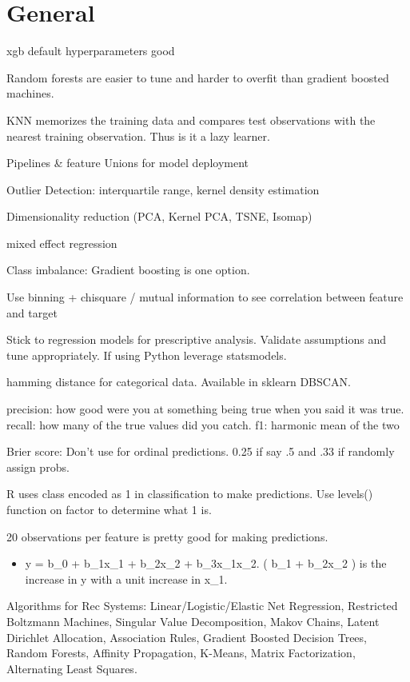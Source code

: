 \documentclass[]{book}
\providecommand{\tightlist}{%
  \setlength{\itemsep}{0pt}\setlength{\parskip}{0pt}}
\begin{document}
\hypertarget{general-2}{%
\section{General}\label{general-2}}

xgb default hyperparameters good

Random forests are easier to tune and harder to overfit than gradient boosted machines.

KNN memorizes the training data and compares test observations with the nearest training observation. Thus is it a lazy learner.

Pipelines \& feature Unions for model deployment

Outlier Detection: interquartile range, kernel density estimation

Dimensionality reduction (PCA, Kernel PCA, TSNE, Isomap)

mixed effect regression

Class imbalance: Gradient boosting is one option.

Use binning + chisquare / mutual information to see correlation between feature and target

Stick to regression models for prescriptive analysis. Validate assumptions and tune appropriately. If using Python leverage statsmodels.

hamming distance for categorical data. Available in sklearn DBSCAN.

precision: how good were you at something being true when you said it was true. recall: how many of the true values did you catch. f1: harmonic mean of the two

Brier score: Don't use for ordinal predictions. 0.25 if say .5 and .33 if randomly assign probs.

R uses class encoded as 1 in classification to make predictions. Use levels() function on factor to determine what 1 is.

20 observations per feature is pretty good for making predictions.

\begin{itemize}
\tightlist
\item
  y = b\_0 + b\_1x\_1 + b\_2x\_2 + b\_3x\_1x\_2. ( b\_1 + b\_2x\_2 ) is the increase in y with a unit increase in x\_1.
\end{itemize}

Algorithms for Rec Systems: Linear/Logistic/Elastic Net Regression, Restricted Boltzmann Machines, Singular Value Decomposition, Makov Chains, Latent Dirichlet Allocation, Association Rules, Gradient Boosted Decision Trees, Random Forests, Affinity Propagation, K-Means, Matrix Factorization, Alternating Least Squares.
\end{document}

